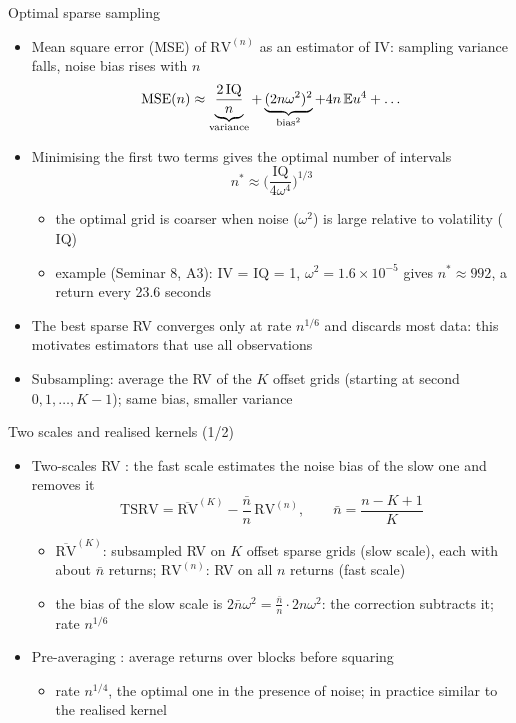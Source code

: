 \begin{frame}{Optimal sparse sampling}
\itemsize{\small}
\begin{itemize}
    \item Mean square error (MSE) of $\mathrm{RV}^{(n)}$ as an estimator of IV: sampling variance falls, noise bias rises with $n$
    \[ \mathrm{MSE}(n) \approx \underbrace{\frac{2\,\mathrm{IQ}}{n}}_{\text{variance}} + \underbrace{(2n\omega^2)^2}_{\text{bias}^2} + 4n\,\mathbb{E} u^4 + \dots \]
    \item Minimising the first two terms gives the optimal number of intervals 
    \[ n^* \approx \Big(\frac{\mathrm{IQ}}{4\omega^4}\Big)^{1/3} \]
    \begin{itemize}
        \item the optimal grid is coarser when noise ($\omega^2$) is large relative to volatility ($\mathrm{IQ}$)
        \item example (Seminar 8, A3): IV = IQ = 1, $\omega^2 = 1.6\times10^{-5}$ gives $n^* \approx 992$, a return every 23.6 seconds
    \end{itemize}
    \item The best sparse RV converges only at rate $n^{1/6}$ and discards most data: this motivates estimators that use all observations
    \item Subsampling: average the RV of the $K$ offset grids (starting at second $0, 1, \dots, K-1$); same bias, smaller variance
\end{itemize}
\end{frame}

\begin{frame}{Two scales and realised kernels (1/2)}
\itemsize{\small}
\begin{itemize}
    \item Two-scales RV : the fast scale estimates the noise bias of the slow one and removes it
    \[ \mathrm{TSRV} = \overline{\mathrm{RV}}^{(K)} - \frac{\bar n}{n}\,\mathrm{RV}^{(n)}, \qquad \bar n = \frac{n - K + 1}{K} \]
    \begin{itemize}
        \item $\overline{\mathrm{RV}}^{(K)}$: subsampled RV on $K$ offset sparse grids (slow scale), each with about $\bar n$ returns; $\mathrm{RV}^{(n)}$: RV on all $n$ returns (fast scale)
        \item the bias of the slow scale is $2\bar n\omega^2 = \frac{\bar n}{n}\cdot 2n\omega^2$: the correction subtracts it; rate $n^{1/6}$
    \end{itemize}
    \item Pre-averaging : average returns over blocks before squaring
    \begin{itemize}
        \item rate $n^{1/4}$, the optimal one in the presence of noise; in practice similar to the realised kernel
    \end{itemize}
\end{itemize}
\end{frame}

